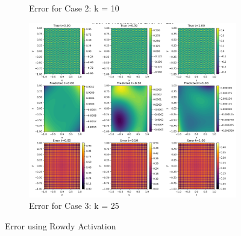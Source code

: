 \documentclass[11pt]{article}
\begin{document}
\begin{figure}[h!]
\begin{subfigure}[b]{0.48\textwidth}
        \caption{Error for Case 2: k = 10}
        \label{fig:Error_K2_Rowdy}
    \end{subfigure}
    \hfill
    \begin{subfigure}[b]{0.48\textwidth}
        \includegraphics[width=\textwidth]{2D_Error_K3.png}
        \caption{Error for Case 3: k = 25}
        \label{fig:Error_K3_Rowdy}
    \end{subfigure}
    \caption{Error using Rowdy Activation}
    \label{fig:Error_Rowdy}
\end{figure}
\pagebreak
\end{document}
